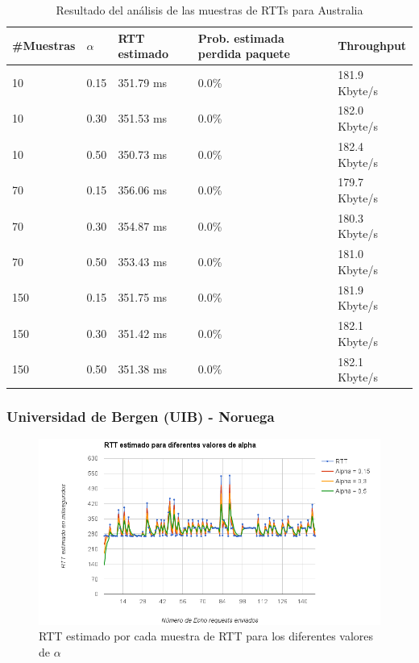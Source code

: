 \begin{table}[H]
	\centering
    \begin{tabular}{lllll}
    \hline
    \#Muestras & $\alpha$ & RTT estimado &Prob. estimada perdida paquete & Throughput \\	\hline
    10   &  0.15  &  351.79 ms  &  0.0\%  &  181.9 Kbyte/s  \\
    10   &  0.30  &  351.53 ms  &  0.0\%  &  182.0 Kbyte/s  \\
    10   &  0.50  &  350.73 ms  &  0.0\%  &  182.4 Kbyte/s  \\
    70   &  0.15  &  356.06 ms  &  0.0\%  &  179.7 Kbyte/s  \\
    70   &  0.30  &  354.87 ms  &  0.0\%  &  180.3 Kbyte/s  \\
    70   &  0.50  &  353.43 ms  &  0.0\%  &  181.0 Kbyte/s  \\
    150  &  0.15  &  351.75 ms  &  0.0\%  &  181.9 Kbyte/s  \\
    150  &  0.30  &  351.42 ms  &  0.0\%  &  182.1 Kbyte/s  \\
    150  &  0.50  &  351.38 ms  &  0.0\%  &  182.1 Kbyte/s  \\ \hline
    \end{tabular}
    \caption{Resultado del análisis de las muestras de RTTs para Australia}
  \label{fig:tabla-ertt-aus}
\end{table}


\subsubsection{Universidad de Bergen (UIB) - Noruega}

\begin{figure}[H]
\begin{changemargin}{-5cm}{-5cm}
    \includegraphics[width=1.5\textwidth]{../Experimentacion/Noruega/ertt.png}
    \caption{RTT estimado por cada muestra de RTT para los diferentes valores de $\alpha$}
  \label{ertt-nor}
\end{changemargin}
\end{figure}

